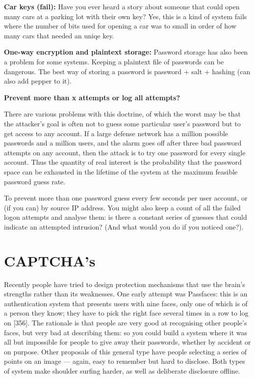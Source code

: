 	{\bf Car keys (fail):} Have you ever heard a story about someone that could open 
	many cars at a parking lot with their own key? Yes, this is a kind of system fails
	where the number of bits used for opening a car was to small in order of how many
	cars that needed an uniqe key.

	{\bf One-way encryption and plaintext storage:} Password storage has also been a problem 
	for some systems. Keeping a plaintext file of passwords can be dangerous. The best way
	of storing a password is password + salt + hashing (can also add pepper to it).

	{\bf Prevent more than x attempts or log all attempts? }

	There are various problems with this doctrine, of which the worst may be that 
	the attacker’s goal is often not to guess some particular user’s password 
	but to get access to any account. If a large defense network has a million 
	possible passwords and a million users, and the alarm goes off after three 
	bad password attempts on any account, then the attack is to try one password 
	for every single account. Thus the quantity of real interest is the probability 
	that the password space can be exhausted in the lifetime of the system at the 
	maximum feasible password guess rate.

	To prevent more than one password guess every few seconds per user account, or 
	(if you can) by source IP address. You might also keep a count of all the failed 
	logon attempts and analyse them: is there a constant series of guesses that could 
	indicate an attempted intrusion? (And what would you do if you noticed one?).

\section{CAPTCHA's}

	Recently people have tried to design protection mechanisms that use the
	brain’s strengths rather than its weaknesses. One early attempt was Passfaces:
	this is an authentication system that presents users with nine faces, only one
	of which is of a person they know; they have to pick the right face several
	times in a row to log on [356]. The rationale is that people are very good
	at recognising other people’s faces, but very bad at describing them: so you
	could build a system where it was all but impossible for people to give away
	their passwords, whether by accident or on purpose. Other proposals of this
	general type have people selecting a series of points on an image — again,
	easy to remember but hard to disclose. Both types of system make shoulder
	surfing harder, as well as deliberate disclosure offline.

